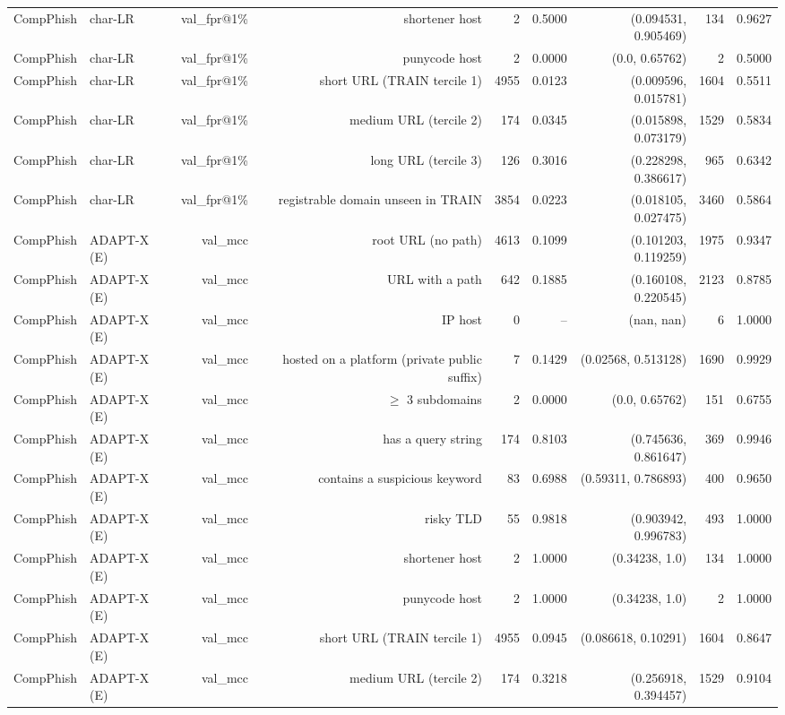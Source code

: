 \begin{table}[t]
\begin{tabular}{llrrrrrrr}
CompPhish & char-LR & val\_fpr@1\% & shortener host & 2 & 0.5000 & (0.094531, 0.905469) & 134 & 0.9627 \\
CompPhish & char-LR & val\_fpr@1\% & punycode host & 2 & 0.0000 & (0.0, 0.65762) & 2 & 0.5000 \\
CompPhish & char-LR & val\_fpr@1\% & short URL (TRAIN tercile 1) & 4955 & 0.0123 & (0.009596, 0.015781) & 1604 & 0.5511 \\
CompPhish & char-LR & val\_fpr@1\% & medium URL (tercile 2) & 174 & 0.0345 & (0.015898, 0.073179) & 1529 & 0.5834 \\
CompPhish & char-LR & val\_fpr@1\% & long URL (tercile 3) & 126 & 0.3016 & (0.228298, 0.386617) & 965 & 0.6342 \\
CompPhish & char-LR & val\_fpr@1\% & registrable domain unseen in TRAIN & 3854 & 0.0223 & (0.018105, 0.027475) & 3460 & 0.5864 \\
CompPhish & ADAPT-X (E) & val\_mcc & root URL (no path) & 4613 & 0.1099 & (0.101203, 0.119259) & 1975 & 0.9347 \\
CompPhish & ADAPT-X (E) & val\_mcc & URL with a path & 642 & 0.1885 & (0.160108, 0.220545) & 2123 & 0.8785 \\
CompPhish & ADAPT-X (E) & val\_mcc & IP host & 0 & -- & (nan, nan) & 6 & 1.0000 \\
CompPhish & ADAPT-X (E) & val\_mcc & hosted on a platform (private public suffix) & 7 & 0.1429 & (0.02568, 0.513128) & 1690 & 0.9929 \\
CompPhish & ADAPT-X (E) & val\_mcc & $\geq$ 3 subdomains & 2 & 0.0000 & (0.0, 0.65762) & 151 & 0.6755 \\
CompPhish & ADAPT-X (E) & val\_mcc & has a query string & 174 & 0.8103 & (0.745636, 0.861647) & 369 & 0.9946 \\
CompPhish & ADAPT-X (E) & val\_mcc & contains a suspicious keyword & 83 & 0.6988 & (0.59311, 0.786893) & 400 & 0.9650 \\
CompPhish & ADAPT-X (E) & val\_mcc & risky TLD & 55 & 0.9818 & (0.903942, 0.996783) & 493 & 1.0000 \\
CompPhish & ADAPT-X (E) & val\_mcc & shortener host & 2 & 1.0000 & (0.34238, 1.0) & 134 & 1.0000 \\
CompPhish & ADAPT-X (E) & val\_mcc & punycode host & 2 & 1.0000 & (0.34238, 1.0) & 2 & 1.0000 \\
CompPhish & ADAPT-X (E) & val\_mcc & short URL (TRAIN tercile 1) & 4955 & 0.0945 & (0.086618, 0.10291) & 1604 & 0.8647 \\
CompPhish & ADAPT-X (E) & val\_mcc & medium URL (tercile 2) & 174 & 0.3218 & (0.256918, 0.394457) & 1529 & 0.9104 \\

\end{tabular}
\end{table}
